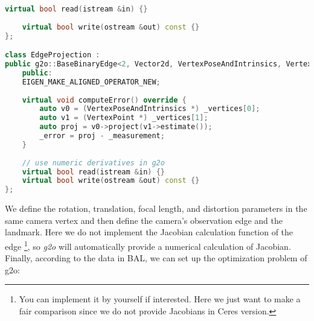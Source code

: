 \begin{lstlisting}[language=c++,caption=slambook2/ch9/bundle_adjustment_g2o.cpp (part)]
	virtual bool read(istream &in) {}
	
	virtual bool write(ostream &out) const {}
};

class EdgeProjection :
public g2o::BaseBinaryEdge<2, Vector2d, VertexPoseAndIntrinsics, VertexPoint> {
	public:
	EIGEN_MAKE_ALIGNED_OPERATOR_NEW;
	
	virtual void computeError() override {
		auto v0 = (VertexPoseAndIntrinsics *) _vertices[0];
		auto v1 = (VertexPoint *) _vertices[1];
		auto proj = v0->project(v1->estimate());
		_error = proj - _measurement;
	}
	
	// use numeric derivatives in g2o
	virtual bool read(istream &in) {}
	virtual bool write(ostream &out) const {}
};
\end{lstlisting}

We define the rotation, translation, focal length, and distortion parameters in the same camera vertex and then define the camera's observation edge and the landmark. Here we do not implement the Jacobian calculation function of the edge \footnote{You can implement it by yourself if interested. Here we just want to make a fair comparison since we do not provide Jacobians in Ceres version.}, so \textit{g2o} will automatically provide a numerical calculation of Jacobian. Finally, according to the data in BAL, we can set up the optimization problem of g2o:
